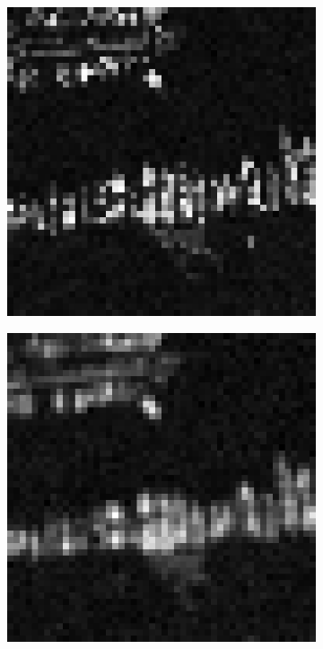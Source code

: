 \begin{figure}[t]
\begin{subfigure}{0.2\textwidth}
\end{subfigure}%
\begin{subfigure}{0.2\textwidth}
\includegraphics[width=\textwidth]{img/aliasedImg1L5}
\end{subfigure}
\begin{subfigure}{0.2\textwidth}
\includegraphics[width=\textwidth]{img/aliasedImg2L1}

\end{subfigure}
\end{figure}

